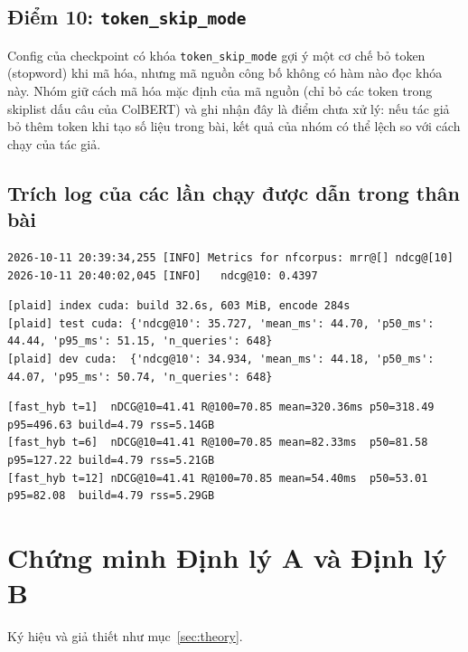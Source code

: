 \documentclass[a4paper,13pt]{extreport}
\theoremstyle{plain}
\newcommand{\fasthyb}{\texttt{fast\_hyb}}
\begin{document}
\section{Điểm 10: \texttt{token\_skip\_mode}}
Config của checkpoint có khóa \texttt{token\_skip\_mode} gợi ý một cơ chế bỏ token (stopword) khi mã hóa, nhưng mã nguồn công bố không có hàm nào đọc khóa này. Nhóm giữ cách mã hóa mặc định của mã nguồn (chỉ bỏ các token trong skiplist dấu câu của ColBERT) và ghi nhận đây là điểm chưa xử lý: nếu tác giả bỏ thêm token khi tạo số liệu trong bài, kết quả của nhóm có thể lệch so với cách chạy của tác giả.

\section{Trích log của các lần chạy được dẫn trong thân bài}
\begin{lstlisting}[style=log, caption={NFCorpus bằng mã đã sửa (\texttt{logs/A\_fixed\_nfcorpus.log}), dẫn ở Bảng~\ref{tab:test}.}]
2026-10-11 20:39:34,255 [INFO] Metrics for nfcorpus: mrr@[] ndcg@[10]
2026-10-11 20:40:02,045 [INFO]   ndcg@10: 0.4397
\end{lstlisting}
\begin{lstlisting}[style=log, caption={Đo PLAID trên FiQA (\texttt{logs/plaid\_bench.log}), dẫn ở Bảng~\ref{tab:perf}.}]
[plaid] index cuda: build 32.6s, 603 MiB, encode 284s
[plaid] test cuda: {'ndcg@10': 35.727, 'mean_ms': 44.70, 'p50_ms': 44.44, 'p95_ms': 51.15, 'n_queries': 648}
[plaid] dev cuda:  {'ndcg@10': 34.934, 'mean_ms': 44.18, 'p50_ms': 44.07, 'p95_ms': 50.74, 'n_queries': 648}
\end{lstlisting}
\begin{lstlisting}[style=log, caption={Kernel \fasthyb\ trên 648 query FiQA test (\texttt{opt/logs/fiqa\_test\_fast.log}), dẫn ở Bảng~\ref{tab:opt-dist}.}]
[fast_hyb t=1]  nDCG@10=41.41 R@100=70.85 mean=320.36ms p50=318.49 p95=496.63 build=4.79 rss=5.14GB
[fast_hyb t=6]  nDCG@10=41.41 R@100=70.85 mean=82.33ms  p50=81.58  p95=127.22 build=4.79 rss=5.21GB
[fast_hyb t=12] nDCG@10=41.41 R@100=70.85 mean=54.40ms  p50=53.01  p95=82.08  build=4.79 rss=5.29GB
\end{lstlisting}

\chapter{Chứng minh Định lý A và Định lý B}
\label{app:proofs}
Ký hiệu và giả thiết như mục~\ref{sec:theory}.
\end{document}
